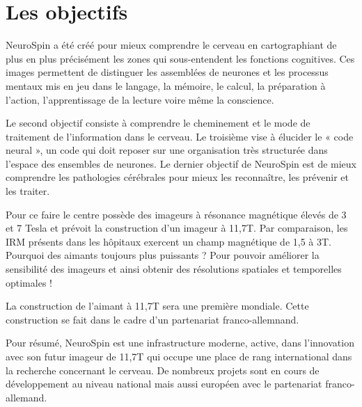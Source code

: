 \section{Les objectifs}

NeuroSpin a été créé pour mieux comprendre le cerveau en cartographiant de plus en plus précisément les zones qui sous-entendent les fonctions cognitives.
Ces images permettent de distinguer les assemblées de neurones et les processus mentaux mis en jeu dans le langage, la mémoire, le calcul, la préparation à l’action, l’apprentissage de la lecture voire même la conscience. 

Le second objectif consiste à comprendre le cheminement et le mode de traitement de l’information dans le cerveau.
Le troisième vise à élucider le « code neural », un code qui doit reposer sur une organisation très structurée dans l’espace des ensembles de neurones.
Le dernier objectif de NeuroSpin est de mieux comprendre les pathologies cérébrales pour mieux les reconnaître, les prévenir et les traiter.

Pour ce faire le centre possède des imageurs à résonance magnétique élevés de 3 et 7 Tesla et prévoit la construction d’un imageur à 11,7T. Par comparaison, les IRM présents dans les hôpitaux exercent un champ magnétique de 1,5 à 3T. Pourquoi des aimants toujours plus puissants ? Pour pouvoir améliorer la sensibilité des imageurs et ainsi obtenir des résolutions spatiales et temporelles optimales !

La construction de l’aimant à 11,7T sera une première mondiale. Cette construction se fait dans le cadre d’un partenariat franco-allemnand.

Pour résumé, NeuroSpin est une infrastructure moderne, active, dans l’innovation avec son futur imageur de 11,7T qui occupe une place de rang international dans la recherche concernant le cerveau. De nombreux projets sont en cours de développement au niveau national mais aussi européen avec le partenariat franco-allemand.
